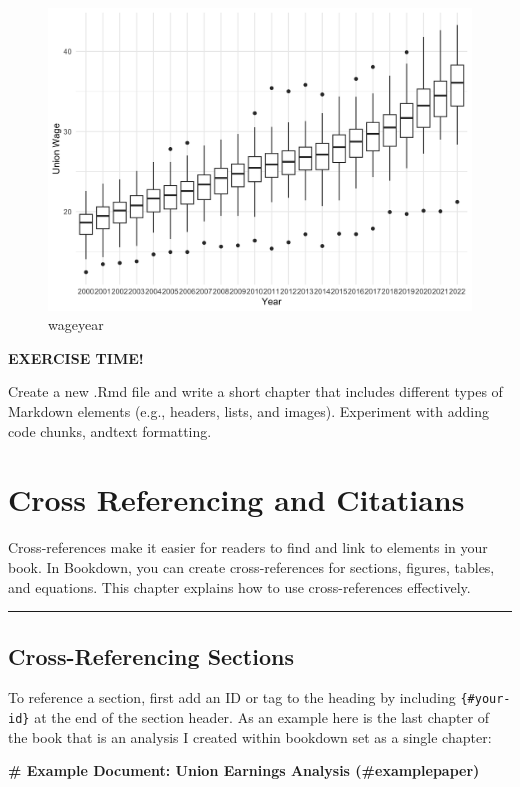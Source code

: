 \documentclass[
]{book}
\newenvironment{Shaded}{\begin{snugshade}}{\end{snugshade}}
\newcommand{\FunctionTok}[1]{\textcolor[rgb]{0.13,0.29,0.53}{\textbf{#1}}}
\newenvironment{blackbox}{
  \definecolor{shadecolor}{rgb}{0, 0, 0}  %
  \color{white}
  \begin{shaded}}
 {\end{shaded}}
\theoremstyle{definition}
\theoremstyle{definition}
\theoremstyle{definition}
\theoremstyle{definition}
\theoremstyle{remark}
\begin{document}
\begin{figure}
\includegraphics[width=0.25\linewidth]{images/wageyear-1} \caption{wageyear}\label{fig:unnamed-chunk-9}
\end{figure}

\begin{blackbox}

\begin{center}
\textbf{EXERCISE TIME!}

\end{center}

Create a new .Rmd file and write a short chapter that includes different types of Markdown elements (e.g., headers, lists, and images). Experiment with adding code chunks, andtext formatting.

\end{blackbox}

\chapter{Cross Referencing and Citatians}\label{chapter4}

Cross-references make it easier for readers to find and link to elements in your book. In Bookdown, you can create cross-references for sections, figures, tables, and equations. This chapter explains how to use cross-references effectively.

\begin{center}\rule{0.5\linewidth}{0.5pt}\end{center}

\section{Cross-Referencing Sections}\label{cross-referencing-sections}

To reference a section, first add an ID or tag to the heading by including \texttt{\{\#your-id\}} at the end of the section header. As an example here is the last chapter of the book that is an analysis I created within bookdown set as a single chapter:

\begin{Shaded}
\begin{Highlighting}[]
\FunctionTok{\# Example Document: Union Earnings Analysis (\#examplepaper)}
\end{Highlighting}
\end{Shaded}
\end{document}
